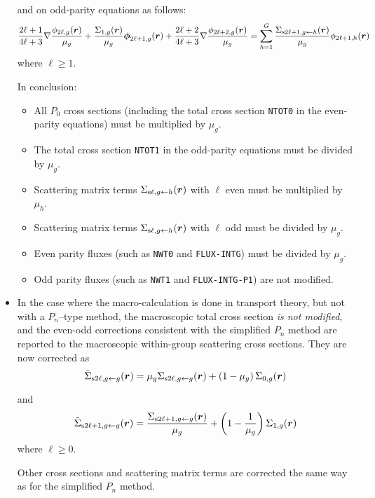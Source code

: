 \begin{itemize}
\noindent and on odd-parity equations as follows:
\begin{equation}
{2\ell+1\over 4\ell+3}\nabla{\phi_{2\ell,g}(\bff(r))\over \mu_g}+{\Sigma_{1,g}(\bff(r))\over \mu_g}\bff(\phi)_{2\ell+1,g}(\bff(r))+{2\ell+2\over 4\ell+3}\nabla{\phi_{2\ell+2,g}(\bff(r))\over \mu_g}=\sum_{h=1}^G {\Sigma_{{\rm s2\ell+1},g\leftarrow h}(\bff(r))\over \mu_g}\phi_{2\ell+1,h}(\bff(r))
\label{eq:sph5}
\end{equation}
\noindent where $\ell\ge 1.$
\vskip 0.08cm

In conclusion:
\begin{itemize}
\item All $P_0$ cross sections (including the total cross section {\tt NTOT0} in the even-parity equations) must be multiplied by $\mu_g$.
\item The total cross section {\tt NTOT1} in the odd-parity equations must be divided by $\mu_g$.
\item Scattering matrix terms $\Sigma_{{\rm s\ell},g\leftarrow h}(\bff(r))$ with $\ell$ even must be multiplied by $\mu_h$.
\item Scattering matrix terms $\Sigma_{{\rm s\ell},g\leftarrow h}(\bff(r))$ with $\ell$ odd must be divided by $\mu_g$.
\item Even parity fluxes (such as {\tt NWT0} and {\tt FLUX-INTG}) must be divided by $\mu_g$.
\item Odd parity fluxes (such as {\tt NWT1} and {\tt FLUX-INTG-P1}) are not modified.
\end{itemize}

\item In the case where the macro-calculation is done in transport theory, but not with a $P_n$--type method, the macroscopic
total cross section {\sl is not modified}, and the even-odd corrections consistent with the simplified $P_n$ method are reported to the
macroscopic within-group scattering cross sections. They are now corrected as\cite{cns2015}
\begin{equation}
\tilde\Sigma_{{\rm s2\ell},g\leftarrow g}(\bff(r))=\mu_g\Sigma_{{\rm s2\ell},g\leftarrow g}(\bff(r))+(1-\mu_g)\, \Sigma_{0,g}(\bff(r))
\label{eq:sph6}
\end{equation}

\noindent and
\begin{equation}
\tilde\Sigma_{{\rm s2\ell+1},g\leftarrow g}(\bff(r))={\Sigma_{{\rm s2\ell+1},g\leftarrow g}(\bff(r))\over\mu_g}+\left(1-{1\over \mu_g}\right)\Sigma_{1,g}(\bff(r))
\label{eq:sph7}
\end{equation}
\noindent where $\ell\ge 0.$

\vskip 0.08cm

Other cross sections and scattering matrix terms are corrected the same way as for the simplified $P_n$ method.

\end{itemize}

